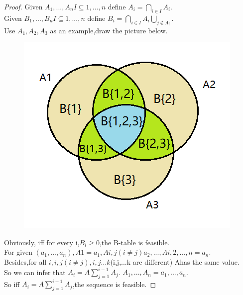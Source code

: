 \documentclass[12pt,a4]{article}
\begin{document}
\begin{proof}
Given $A_1,...,A_n I\subseteq{1,...,n}$ define $A_i=\bigcap\limits_{i \in I} A_i$.
\\Given $B_1,...,B_n I\subseteq{1,...,n}$ define $B_i=\bigcap\limits_{i \in I} A_i\bigcup \limits_{j \notin A_i}$.
\\Use $A_1,A_2,A_3$ as an example,draw the picture below.
 \begin{figure}[H]
	\begin{center}
		\includegraphics[width=0.32\linewidth]{Exercise33-1.png}
		\caption{}
		\label{Fig:3}
	\end{center}
	\vspace{-0.5em}
    \end{figure}
    Obviously, iff for every i,$B_i \geq 0$,the B-table is feasible.
    \\For given $(a_1,...,a_n),A{1}=a_1,A{i,j}(i\not=j)a_2,...,A{i,2,...,n}=a_n$.
    \\Besides,for all ${i},{i,j}(i \not=j),{i,j...k}$(i,j,...k are different) A{}has the same value.
    \\So we can infer that $A_i=A\sum_{j=1}^{i-1}A_j$.
    ${A_1,...,A_n}={a_1,...,a_n}$.
    \\So iff $A_i=A\sum_{j=1}^{i-1}A_j$,the sequence is feasible.
\end{proof}
\end{document}
